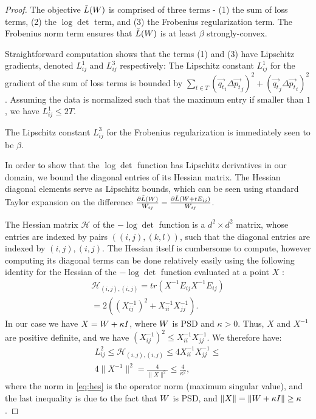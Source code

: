 \documentclass{article}
\begin{document}
\begin{proof}


The objective $\tilde{L}({W})$ is comprised of three terms - (1) the sum of loss terms, (2) the $\log \det$ term, and (3) the Frobenius regularization term. The Frobenius norm term ensures that $\tilde{L}({W})$ is at least $\beta$ strongly-convex.

Straightforward computation shows that the terms (1) and (3) have Lipschitz gradients, denoted $L^1_{ij}$ and $L^3_{ij}$ respectively: The Lipschitz constant $L^1_{ij}$ for the gradient of the sum of loss terms is bounded by $\sum_{t \in T} (\vec{{q_t}}_i {\Delta \vec{p_t}}_j)^2 + (\vec{{q_t}}_j {\Delta \vec{p_t}}_i)^2$. Assuming the data is normalized such that the maximum entry if smaller than $1$, we have $L^1_{ij} \leq 2 T$.

The Lipschitz constant $L^3_{ij}$ for the Frobenius regularization is immediately seen to be $\beta$.

In order to show that the $\log \det$ function has Lipschitz derivatives in our domain, we bound the diagonal entries of its Hessian matrix. The Hessian diagonal elements serve as Lipschitz bounds, which can be seen using standard Taylor expansion on the difference $\frac{\partial \tilde{L}({W})}{W_{ij}} - \frac{\partial \tilde{L}({W} + t {E}_{ij})}{W_{ij}}$.

The Hessian matrix $\mathcal{H}$ of the $- \log \det$ function is a $d^2 \times d^2$ matrix, whose entries are indexed by pairs $((i,j),(k,l))$, such that the diagonal entries are indexed by $(i,j),(i,j)$. The Hessian itself is cumbersome to compute, however computing its diagonal terms can be done relatively easily using the following identity for the Hessian of the $-\log \det$ function evaluated at a point $X$ \citep{boyd2004convex}:  
\begin{align*}
\mathcal{H}_{(i,j),(i,j)} = tr\left(X^{-1}E_{ij} X^{-1}E_{ij}\right)  \\
= 2 \left((X^{-1}_{ij})^2 + X^{-1}_{ii}X^{-1}_{jj}\right).
\end{align*}
In our case we have $X = {W}+\kappa I$, where ${W}$ is PSD and $\kappa >0$. Thus, $X$ and $X^{-1}$ are positive definite, and we have $(X^{-1}_{ij})^2 \leq X^{-1}_{ii}X^{-1}_{jj}$. We therefore have:
\begin{align}
\label{eq:hes}
L^2_{ij} \leq  \mathcal{H}_{(i,j),(i,j)} \leq 4 X^{-1}_{ii}X^{-1}_{jj} \leq \nonumber \\
4 \|X^{-1}\|^2 = \frac{4}{\|X\|^2} \leq \frac{4}{\kappa^2},
\end{align}
where the norm in \ref{eq:hes} is the operator norm (maximum singular value), and the last inequality is due to the fact that ${W}$ is PSD, and $\|X\| = \| {W} + \kappa I\| \geq \kappa$.


\end{proof}
\end{document}
